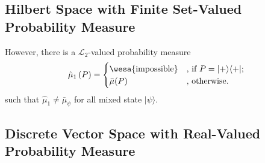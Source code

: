 \documentclass{article}
\theoremstyle{remark}
\newcommand{\ket}[1]{|#1\rangle}
\newcommand{\proj}[1]{|#1 \rangle\langle #1 |}
\newcommand{\imposs}{{\mbox{\wesa{impossible}}}}
\begin{document}
\subsection{Hilbert Space with Finite Set-Valued Probability Measure}

However, there is a $\mathscr{L}_{2}$-valued probability measure
\[
\hat{\mu}_{1}\left(P\right)=\begin{cases}
\imposs & \textrm{, if }P=\proj{+};\\
\bar{\mu}(P) & \textrm{, otherwise.}
\end{cases}
\]
such that $\hat{\mu}_{1}\ne\bar{\mu}_{\psi}$ for all mixed state
$\ket{\psi}$.

\subsection{Discrete Vector Space with Real-Valued Probability Measure}





\end{document}
